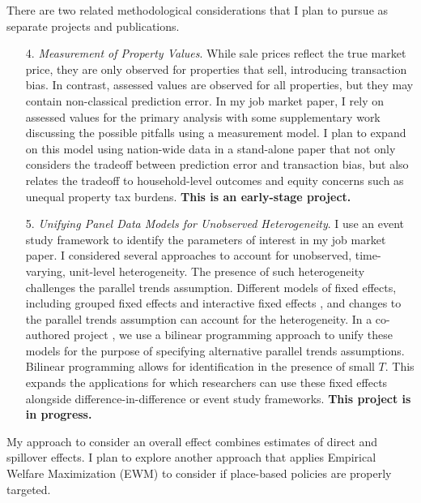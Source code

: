 There are two related methodological considerations that I plan to pursue as separate projects and publications.

\begin{enumerate}
\item[4.] \textit{Measurement of Property Values}. While sale prices reflect the true market price, they are only observed for properties that sell, introducing transaction bias. In contrast, assessed values are observed for all properties, but they may contain non-classical prediction error. In my job market paper, I rely on assessed values for the primary analysis with some supplementary work discussing the possible pitfalls using a measurement model. I plan to expand on this model using nation-wide data in a stand-alone paper that not only considers the tradeoff between prediction error and transaction bias, but also relates the tradeoff to household-level outcomes and equity concerns such as unequal property tax burdens. \textbf{This is an early-stage project.}

\item[5.] \textit{Unifying Panel Data Models for Unobserved Heterogeneity}. I use an event study framework to identify the parameters of interest in my job market paper. I considered several approaches to account for unobserved, time-varying, unit-level heterogeneity. The presence of such heterogeneity challenges the parallel trends assumption. Different models of fixed effects, including grouped fixed effects and interactive fixed effects \citep{bai_panel_2009,bonhomme_grouped_2015}, and changes to the parallel trends assumption can account for the heterogeneity. In a co-authored project \citep{shea_unifying_2023}, we use a bilinear programming approach to unify these models for the purpose of specifying alternative parallel trends assumptions. Bilinear programming allows for identification in the presence of small $T$. This expands the applications for which researchers can use these fixed effects alongside difference-in-difference or event study frameworks. \textbf{This project is in progress.}
\end{enumerate} 

My approach to consider an overall effect combines estimates of direct and spillover effects. I plan to explore another approach that applies Empirical Welfare Maximization (EWM) to consider if place-based policies are properly targeted.

